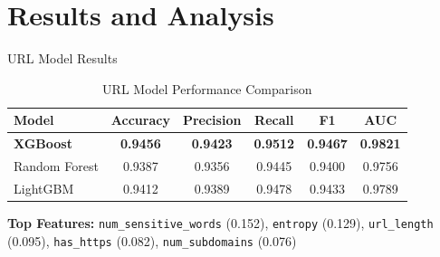 \documentclass[aspectratio=169,12pt]{beamer}
\begin{document}
\section{Results and Analysis}

\begin{frame}{URL Model Results}
    \begin{table}
        \centering
        \small
        \begin{tabular}{lccccc}
            \toprule
            \textbf{Model} & \textbf{Accuracy} & \textbf{Precision} & \textbf{Recall} & \textbf{F1} & \textbf{AUC} \\
            \midrule
            \textbf{XGBoost} & \textbf{0.9456} & \textbf{0.9423} & \textbf{0.9512} & \textbf{0.9467} & \textbf{0.9821} \\
            Random Forest & 0.9387 & 0.9356 & 0.9445 & 0.9400 & 0.9756 \\
            LightGBM & 0.9412 & 0.9389 & 0.9478 & 0.9433 & 0.9789 \\
            \bottomrule
        \end{tabular}
        \caption{URL Model Performance Comparison}
    \end{table}
    \vspace{0.2cm}
    \textbf{Top Features:} \texttt{num\_sensitive\_words} (0.152), \texttt{entropy} (0.129), \texttt{url\_length} (0.095), \texttt{has\_https} (0.082), \texttt{num\_subdomains} (0.076)
\end{frame}
\end{document}
